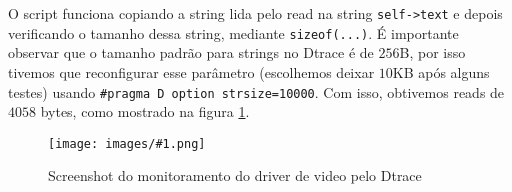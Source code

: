 \documentclass[a4paper]{scrartcl}
\newcommand{\code}[1]{}
\newcommand{\Fig}[2]{
\begin{figure}
        \centering
        \texttt{[image: images/\#1.png]}
        \caption{#2}
        \label{fig:#1}
\end{figure}}
\begin{document}
\code{read_cheese.d}

O script funciona copiando a string lida pelo read na string {\tt self->text} e depois verificando o tamanho dessa string, mediante {\tt sizeof(...)}. É importante observar que o tamanho padrão para strings no Dtrace é de $256$B, por isso tivemos que reconfigurar esse parâmetro (escolhemos deixar $10$KB após alguns testes) usando {\tt \#pragma D option strsize=10000}. Com isso, obtivemos reads de $4058$ bytes, como mostrado na figura \ref{fig:fase03_ss2}.

\Fig{fase03_ss2}{Screenshot do monitoramento do driver de video pelo Dtrace}

\newpage

\nocite{ref01}
\nocite{ref02}
\nocite{ref03}
\nocite{ref04}
\nocite{ref05}
\nocite{ref06}



\end{document}
